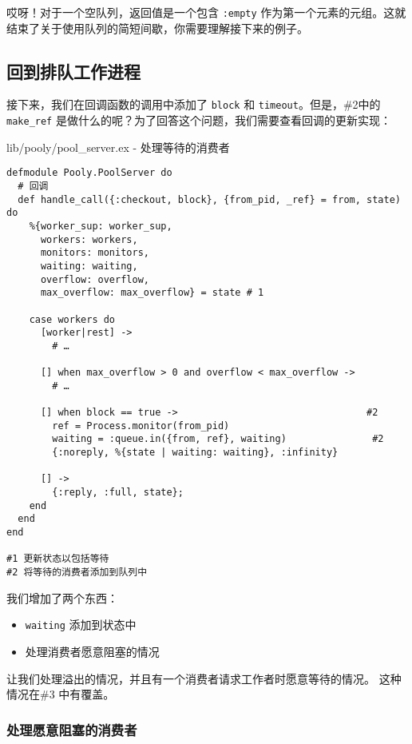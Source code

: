 哎呀！对于一个空队列，返回值是一个包含 \texttt{:empty}
作为第一个元素的元组。这就结束了关于使用队列的简短间歇，你需要理解接下来的例子。

\subsection{回到排队工作进程}

接下来，我们在回调函数的调用中添加了 \texttt{block} 和
\texttt{timeout}。但是，\#2中的
\texttt{make\_ref}
是做什么的呢？为了回答这个问题，我们需要查看回调的更新实现：

\begin{code}{lib/pooly/pool\_server.ex - 处理等待的消费者}

\begin{verbatim}
defmodule Pooly.PoolServer do
  # 回调
  def handle_call({:checkout, block}, {from_pid, _ref} = from, state) do
    %{worker_sup: worker_sup,
      workers: workers,
      monitors: monitors,
      waiting: waiting,
      overflow: overflow,
      max_overflow: max_overflow} = state # 1

    case workers do
      [worker|rest] ->
        # …

      [] when max_overflow > 0 and overflow < max_overflow ->
        # …

      [] when block == true ->                                 #2
        ref = Process.monitor(from_pid)
        waiting = :queue.in({from, ref}, waiting)               #2
        {:noreply, %{state | waiting: waiting}, :infinity}

      [] ->
        {:reply, :full, state};
    end
  end
end

#1 更新状态以包括等待
#2 将等待的消费者添加到队列中
\end{verbatim}
\end{code}



我们增加了两个东西：

\begin{itemize}

\item  \texttt{waiting} 添加到状态中
\item  处理消费者愿意阻塞的情况
\end{itemize}

让我们处理溢出的情况，并且有一个消费者请求工作者时愿意等待的情况。
这种情况在\#3 中有覆盖。

\subsubsection{处理愿意阻塞的消费者}

